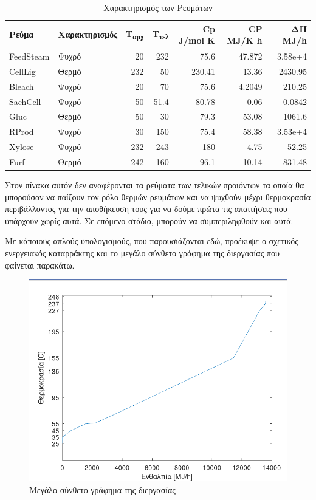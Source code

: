 \documentclass[11pt]{article}
\begin{document}
\begin{table}[htbp]
\caption{Χαρακτηρισμός των Ρευμάτων}
\centering
\begin{tabular}{llrrrrr}
Ρεύμα & Χαρακτηρισμός & Τ\textsubscript{αρχ} & Τ\textsubscript{τελ} & Cp J/mol K & CP MJ/K h & ΔΗ MJ/h\\
\hline
FeedSteam & Ψυχρό & 20 & 232 & 75.6 & 47.872 & 3.58e+4\\
CellLig & Θερμό & 232 & 50 & 230.41 & 13.36 & 2430.95\\
Bleach & Ψυχρό & 20 & 70 & 75.6 & 4.2049 & 210.25\\
SachCell & Ψυχρό & 50 & 51.4 & 80.78 & 0.06 & 0.0842\\
Gluc & Θερμό & 50 & 30 & 79.3 & 53.08 & 1061.6\\
RProd & Ψυχρό & 30 & 150 & 75.4 & 58.38 & 3.53e+4\\
Xylose & Ψυχρό & 232 & 243 & 180 & 4.75 & 52.25\\
Furf & Θερμό & 242 & 160 & 96.1 & 10.14 & 831.48\\
\end{tabular}
\end{table}

Στον πίνακα αυτόν δεν αναφέρονται τα ρεύματα των τελικών προιόντων τα οποία θα μπορούσαν να παίξουν τον ρόλο θερμών ρευμάτων και να ψυχθούν μέχρι θερμοκρασία περιβάλλοντος για την αποθήκευση τους για να δούμε πρώτα τις απαιτήσεις που υπάρχουν χωρίς αυτά. Σε επόμενο στάδιο, μπορούν να συμπεριληφθούν και αυτά.

Με κάποιους απλούς υπολογισμούς, που παρουσιάζονται \href{https://github.com/Vidianos-Giannitsis/Process-Design/blob/master/energy\_integration.org}{εδώ}, προέκυψε ο σχετικός ενεργειακός καταρράκτης και το μεγάλο σύνθετο γράφημα της διεργασίας που φαίνεται παρακάτω.

\begin{figure}[htbp]
\centering
\includegraphics[width=.9\linewidth]{Ενεργειακή_Ολοκλήρωση_-_Μεγάλο_Σύνθετο_Γράφημα/2023-02-26_18-23-13_screenshot.png}
\caption{Μεγάλο σύνθετο γράφημα της διεργασίας}
\end{figure}
\end{document}

